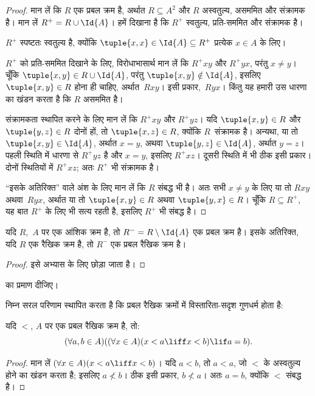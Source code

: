\documentclass[../../../include/open-logic-section]{subfiles}
\begin{document}
\begin{proof}
मान लें कि $R$ एक प्रबल क्रम है, अर्थात $R \subseteq A^2$ और $R$
अस्वतुल्य, असममित और संक्रामक है। मान लें $R^+ = R \cup \Id{A}$। हमें
दिखाना है कि $R^+$ स्वतुल्य, प्रति-सममित और संक्रामक है।

$R^+$ स्पष्टतः स्वतुल्य है, क्योंकि $\tuple{x, x} \in \Id{A} \subseteq
R^+$ प्रत्येक $x \in A$ के लिए। 

$R^+$ को प्रति-सममित दिखाने के लिए, विरोधाभासार्थ मान लें कि $R^+xy$ और
$R^+yx$, परंतु $x \neq y$। चूँकि $\tuple{x,y} \in R \cup \Id{A}$, परंतु
$\tuple{x, y} \notin \Id{A}$, इसलिए $\tuple{x, y} \in R$ होना ही चाहिए,
अर्थात~$Rxy$। इसी प्रकार,~$Ryx$। किंतु यह हमारी उस धारणा का खंडन करता है
कि $R$ असममित है।

संक्रामकता स्थापित करने के लिए मान लें कि $R^+xy$ और $R^+yz$। यदि
$\tuple{x, y} \in R$ और $\tuple{y,z} \in R$ दोनों हों, तो $\tuple{x, z} \in
R$, क्योंकि $R$~संक्रामक है। अन्यथा, या तो $\tuple{x, y} \in
\Id{A}$, अर्थात $x = y$, अथवा $\tuple{y, z} \in \Id{A}$, अर्थात $y = z$।
पहली स्थिति में धारणा से $R^+yz$ है और $x = y$, इसलिए
$R^+xz$। दूसरी स्थिति में भी ठीक इसी प्रकार। दोनों स्थितियों में $R^+xz$;
अतः $R^+$ भी संक्रामक है।

“इसके अतिरिक्त” वाले अंश के लिए मान लें कि $R$ संबद्ध भी है। अतः सभी
$x \neq y$ के लिए या तो $Rxy$ अथवा~$Ryx$, अर्थात या तो
$\tuple{x, y} \in R$ अथवा $\tuple{y, x} \in R$। चूँकि $R \subseteq R^+$,
यह बात $R^+$ के लिए भी सत्य रहती है, इसलिए $R^+$ भी संबद्ध है।
\end{proof}

\begin{prop}
यदि $R$,~$A$ पर एक आंशिक क्रम है, तो $R^- = R \setminus \Id{A}$ एक प्रबल
क्रम है। इसके अतिरिक्त, यदि $R$ एक रैखिक क्रम है, तो $R^-$ एक प्रबल
रैखिक क्रम है।
\end{prop}

\begin{proof}
इसे अभ्यास के लिए छोड़ा जाता है।
\end{proof}

\begin{prob}
 का प्रमाण दीजिए। 
\end{prob}

निम्न सरल परिणाम स्थापित करता है कि प्रबल रैखिक क्रमों में
विस्तारिता-सदृश गुणधर्म होता है:

\begin{prop}
यदि $<$, $A$ पर एक प्रबल रैखिक क्रम है, तो:
\[
  (\forall a, b \in A)((\forall x \in A)(x < a \liff x < b) \lif a = b).
\]
\end{prop}

\begin{proof}
मान लें $(\forall x \in A)(x < a \liff x < b)$। यदि $a < b$, तो $a <
a$, जो $<$ के अस्वतुल्य होने का खंडन करता है; इसलिए $a \nless b$।
ठीक इसी प्रकार, $b \nless a$। अतः $a = b$, क्योंकि $<$ संबद्ध है।
\end{proof}
\end{document}
